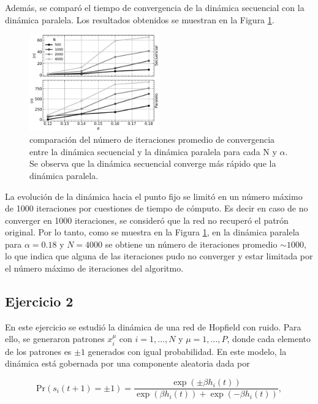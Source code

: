 \documentclass[11pt, twocolumn]{article}
\begin{document}
Además, se comparó el tiempo de convergencia de la dinámica secuencial con la dinámica paralela. Los resultados obtenidos se muestran en la Figura \ref{fig:ej1_time}.

\begin{figure} [htbp]
    \centering
    \includegraphics[width=0.5\textwidth]{figures/overlap_vs_alpha.pdf}
    \caption{comparación del número de iteraciones promedio de convergencia entre la dinámica secuencial y la dinámica paralela para cada N y \(\alpha\). Se observa que la dinámica secuencial converge más rápido que la dinámica paralela.}
    \label{fig:ej1_time}
\end{figure}

La evolución de la dinámica hacia el punto fijo se limitó en un número máximo de 1000 iteraciones por cuestiones de tiempo de cómputo. Es decir en caso de no converger en 1000 iteraciones, se consideró que la red no recuperó el patrón original. Por lo tanto, como se muestra en la Figura \ref{fig:ej1_time}, en la dinámica paralela para \(\alpha = 0.18\) y \(N = 4000\) se obtiene un número de iteraciones promedio \(\sim 1000\), lo que indica que alguna de las iteraciones pudo no converger y estar limitada por el número máximo de iteraciones del algoritmo.



\subsection*{Ejercicio 2}
En este ejercicio se estudió la dinámica de una red de Hopfield con ruido. Para ello, se generaron patrones \(x_i^\mu\) con \(i = 1, \ldots, N\) y \(\mu = 1, \ldots, P\), donde cada elemento de los patrones es \(\pm 1\) generados con igual probabilidad. En este modelo, la dinámica está gobernada por una componente aleatoria dada por

\begin{equation} \nonumber
    \text{Pr}(s_i(t+1) = \pm 1) = \frac{\exp(\pm \beta h_i(t))}{\exp(\beta h_i(t)) + \exp(-\beta h_i(t))},
\end{equation}
\end{document}
